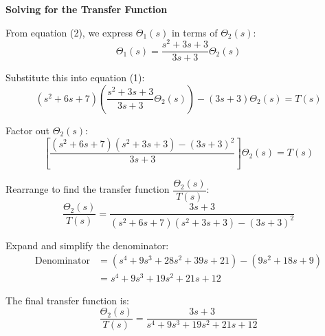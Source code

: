 \documentclass[11pt]{article}
\begin{document}
\noindent\textbf{Solving for the Transfer Function}
\vspace{8pt}

From equation (2), we express $\Theta_1(s)$ in terms of $\Theta_2(s)$:
\[
\Theta_1(s) = \frac{s^2 + 3s + 3}{3s + 3} \Theta_2(s)
\]

Substitute this into equation (1):
\[
(s^2 + 6s + 7) \left( \frac{s^2 + 3s + 3}{3s + 3} \Theta_2(s) \right) - (3s + 3)\Theta_2(s) = T(s)
\]

Factor out $\Theta_2(s)$:
\[
\left[ \frac{(s^2 + 6s + 7)(s^2 + 3s + 3) - (3s + 3)^2}{3s + 3} \right] \Theta_2(s) = T(s)
\]

Rearrange to find the transfer function $\dfrac{\Theta_2(s)}{T(s)}$:
\[
\frac{\Theta_2(s)}{T(s)} = \frac{3s + 3}{(s^2 + 6s + 7)(s^2 + 3s + 3) - (3s + 3)^2}
\]

Expand and simplify the denominator:
\begin{align*}
    \text{Denominator} &= (s^4 + 9s^3 + 28s^2 + 39s + 21) - (9s^2 + 18s + 9) \\
    &= s^4 + 9s^3 + 19s^2 + 21s + 12
\end{align*}

The final transfer function is:
\[
\boxed{\frac{\Theta_2(s)}{T(s)} = \frac{3s + 3}{s^4 + 9s^3 + 19s^2 + 21s + 12}}
\]

\end{document}
